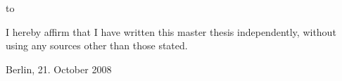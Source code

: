 \thispagestyle{empty}
\vspace*{36\baselineskip}
\hbox to \textwidth{\hrulefill}
\par

I hereby affirm that I have written this master thesis independently, without using any sources other than those stated.

Berlin, 21. October 2008








 